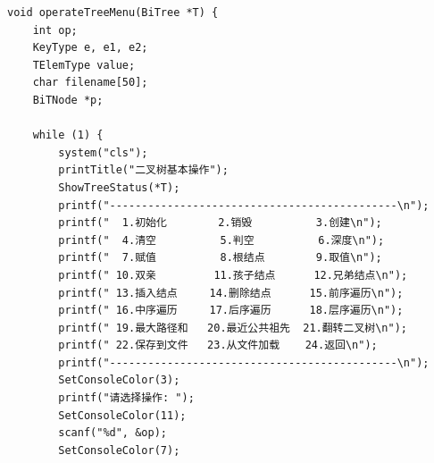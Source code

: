\documentclass[supercite]{Experimental_Report}
\begin{document}
{\begin{lstlisting}
void operateTreeMenu(BiTree *T) {
    int op;
    KeyType e, e1, e2;
    TElemType value;
    char filename[50];
    BiTNode *p;

    while (1) {
        system("cls");
        printTitle("二叉树基本操作");
        ShowTreeStatus(*T);
        printf("---------------------------------------------\n");
        printf("  1.初始化        2.销毁          3.创建\n");
        printf("  4.清空          5.判空          6.深度\n");
        printf("  7.赋值          8.根结点        9.取值\n");
        printf(" 10.双亲         11.孩子结点      12.兄弟结点\n");
        printf(" 13.插入结点     14.删除结点      15.前序遍历\n");
        printf(" 16.中序遍历     17.后序遍历      18.层序遍历\n");
        printf(" 19.最大路径和   20.最近公共祖先  21.翻转二叉树\n");
        printf(" 22.保存到文件   23.从文件加载    24.返回\n");
        printf("---------------------------------------------\n");
        SetConsoleColor(3);
        printf("请选择操作: ");
        SetConsoleColor(11);
        scanf("%d", &op);
        SetConsoleColor(7);


\end{lstlisting}}
\end{document}
